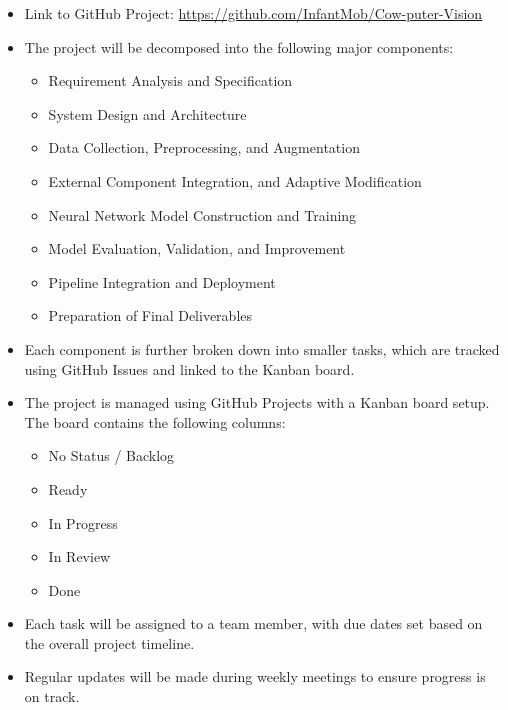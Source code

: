 \documentclass{article}
\begin{document}
\begin{itemize}
  \item Link to GitHub Project: \url{https://github.com/InfantMob/Cow-puter-Vision}
  \item The project will be decomposed into the following major components:
    \begin{itemize}
      \item Requirement Analysis and Specification
      \item System Design and Architecture
      \item Data Collection, Preprocessing, and Augmentation
      \item External Component Integration, and Adaptive Modification
      \item Neural Network Model Construction and Training
      \item Model Evaluation, Validation, and Improvement
      \item Pipeline Integration and Deployment
      \item Preparation of Final Deliverables
    \end{itemize}
  \item Each component is further broken down into smaller tasks, which are tracked using GitHub Issues and linked to the Kanban board.
  \item The project is managed using GitHub Projects with a Kanban board setup. 
        The board contains the following columns: 
        \begin{itemize}
          \item No Status / Backlog
          \item Ready
          \item In Progress
          \item In Review
          \item Done
        \end{itemize}  \item Each task will be assigned to a team member, with due dates set based on the overall project timeline.
  \item Regular updates will be made during weekly meetings to ensure progress is on track.
\end{itemize}
\end{document}
